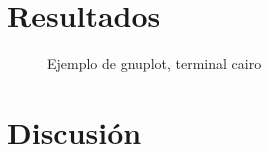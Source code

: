 \documentclass{article}
\begin{document}

\section{Resultados}


\begin{figure}[ht!]
  \centering
  
  \caption{Ejemplo de gnuplot, terminal cairo}
  \label{plot:}
\end{figure}


\section{Discusión}


% 
% 
% 
% 
% 
% 
\end{document}
